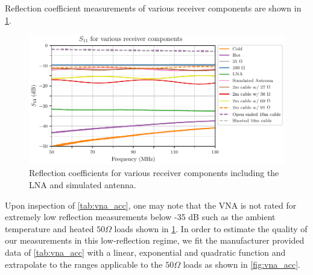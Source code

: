Reflection coefficient measurements of various receiver components are shown in \cref{fig:s11_meas}. 
\begin{figure}
    \centering
    \includegraphics[width=\columnwidth]{s11_meas}
    \caption{Reflection coefficients for various receiver components including the LNA and simulated antenna.}
    \label{fig:s11_meas}
\end{figure}
Upon inspection of \cref{tab:vna_acc}, one may note that the VNA is not rated for extremely low reflection measurements below -35 dB such as the ambient temperature and heated $50 \Omega$ loads shown in \cref{fig:s11_meas}. In order to estimate the quality of our measurements in this low-reflection regime, we fit the manufacturer provided data of \cref{tab:vna_acc} with a linear, exponential and quadratic function and extrapolate to the ranges applicable to the $50 \Omega$ loads as shown in \cref{fig:vna_acc}.
